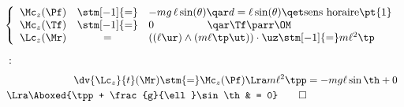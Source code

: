 \documentclass[a4paper, 10pt, final, garamond]{book}
\begin{document}
\begin{enumerate}[label=\sqenumi]
\begin{minipage}{0.70\linewidth}
{\begin{enumerate}[label=\arabic*)]
				\[
					\left\{
					\begin{array}{rcl}
						\Mc_{z}(\Pf) & \stm[-1]{=} & - mg\,\ell \sin(\theta)
						\qar d = \ell \sin(\theta) \qet \text{sens horaire} \pt{1}
						\\
						\Mc_{z}(\Tf) & \stm[-1]{=} & 0
						\quad \quad \quad \quad \quad \qar \Tf \parr \OM
						\\
						\Lc_{z}(\Mr) & =           &
						\left((\ell\ur)\wedge(m\ell\tp\ut) \right)\cdot \uz \stm[-1]{=}
						m\ell^2\tp
					\end{array}
					\right.
				\]
				~:
				\vspace{-25pt}
				\begin{align*}
					\dv{\Lc_z}{t}\/(\Mr) \stm{=} \Mc_z(\Pf)
					\Lra
					m\ell^2\tpp                          & = -mg\ell\sin\th + 0
					\\\Lra
					\Aboxed{\tpp + \frac{g}{\ell}\sin\th & = 0}
					\qed
				\end{align*}
			\end{enumerate}
		}
		\vspace{-15pt}
	\end{minipage}
	\hfill
	\begin{minipage}{0.25\linewidth}
		\begin{center}
\end{center}
\end{minipage}
\end{enumerate}
\end{document}
